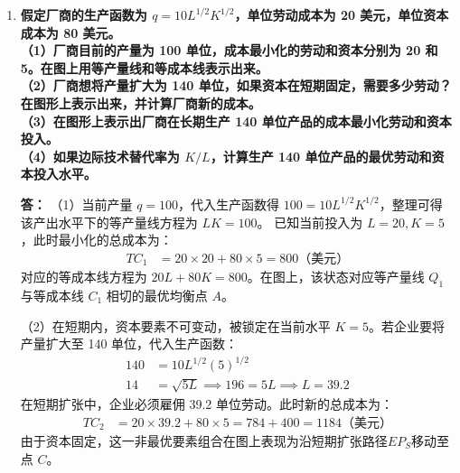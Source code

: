\begin{enumerate}[label=\textbf{\arabic*.}, leftmargin=*]
\begin{center}
		\end{center}
		
		
		
		\item \textbf{假定厂商的生产函数为 $q = 10L^{1/2}K^{1/2}$，单位劳动成本为 20 美元，单位资本成本为 80 美元。\\（1）厂商目前的产量为 100 单位，成本最小化的劳动和资本分别为 20 和 5。在图上用等产量线和等成本线表示出来。\\（2）厂商想将产量扩大为 140 单位，如果资本在短期固定，需要多少劳动？在图形上表示出来，并计算厂商新的成本。\\（3）在图形上表示出厂商在长期生产 140 单位产品的成本最小化劳动和资本投入。\\（4）如果边际技术替代率为 $K / L$，计算生产 140 单位产品的最优劳动和资本投入水平。}
		
		\textbf{答：}
		（1）当前产量 $q=100$，代入生产函数得 $100 = 10L^{1/2}K^{1/2}$，整理可得该产出水平下的等产量线方程为 $LK = 100$。
		已知当前投入为 $L=20, K=5$，此时最小化的总成本为：
		\[
		\begin{aligned}
			TC_1 &= 20 \times 20 + 80 \times 5 = 800 \text{（美元）}
		\end{aligned}
		\]
		对应的等成本线方程为 $20L + 80K = 800$。在图上，该状态对应等产量线 $Q_1$ 与等成本线 $C_1$ 相切的最优均衡点 $A$。
		
		（2）在短期内，资本要素不可变动，被锁定在当前水平 $K = 5$。若企业要将产量扩大至 140 单位，代入生产函数：
		\[
		\begin{aligned}
			140 &= 10L^{1/2}(5)^{1/2} \\
			14 &= \sqrt{5L} \implies 196 = 5L \implies L = 39.2
		\end{aligned}
		\]
		在短期扩张中，企业必须雇佣 39.2 单位劳动。此时新的总成本为：
		\[
		\begin{aligned}
			TC_2 &= 20 \times 39.2 + 80 \times 5 = 784 + 400 = 1184 \text{（美元）}
		\end{aligned}
		\]
		由于资本固定，这一非最优要素组合在图上表现为沿短期扩张路径$EP_S$移动至点 $C$。
		

\end{enumerate}
